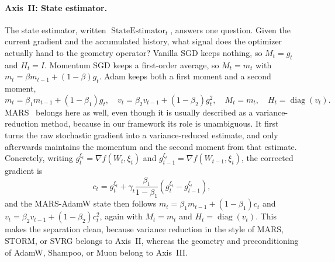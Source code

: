 \paragraph{Axis~II: State estimator.}
The state estimator, written $\operatorname{StateEstimator}_t$, answers one question. Given the current gradient and the accumulated history, what signal does the optimizer actually hand to the geometry operator? Vanilla SGD keeps nothing, so $M_t=g_t$ and $H_t=I$. Momentum SGD keeps a first-order average, so $M_t=m_t$ with $m_t=\beta m_{t-1}+(1-\beta)g_t$. Adam keeps both a first moment and a second moment,
\begin{equation}
  m_t=\beta_1 m_{t-1}+(1-\beta_1)g_t,
  \quad
  v_t=\beta_2 v_{t-1}+(1-\beta_2)g_t^2,
  \quad
  M_t=m_t,
  \quad
  H_t=\operatorname{diag}(v_t).
\end{equation}
MARS~\cite{yuan2024mars} belongs here as well, even though it is usually described as a variance-reduction method, because in our framework its role is unambiguous. It first turns the raw stochastic gradient into a variance-reduced estimate, and only afterwards maintains the momentum and the second moment from that estimate. Concretely, writing $g_t^{\xi_t}=\nabla f(W_t,\xi_t)$ and $g_{t-1}^{\xi_t}=\nabla f(W_{t-1},\xi_t)$, the corrected gradient is
\begin{equation}
  c_t=g_t^{\xi_t}+\gamma_t\frac{\beta_1}{1-\beta_1}\left(g_t^{\xi_t}-g_{t-1}^{\xi_t}\right),
\end{equation}
and the MARS-AdamW state then follows $m_t=\beta_1 m_{t-1}+(1-\beta_1)c_t$ and $v_t=\beta_2 v_{t-1}+(1-\beta_2)c_t^2$, again with $M_t=m_t$ and $H_t=\operatorname{diag}(v_t)$. This makes the separation clean, because variance reduction in the style of MARS, STORM, or SVRG belongs to Axis~II, whereas the geometry and preconditioning of AdamW, Shampoo, or Muon belong to Axis~III.

